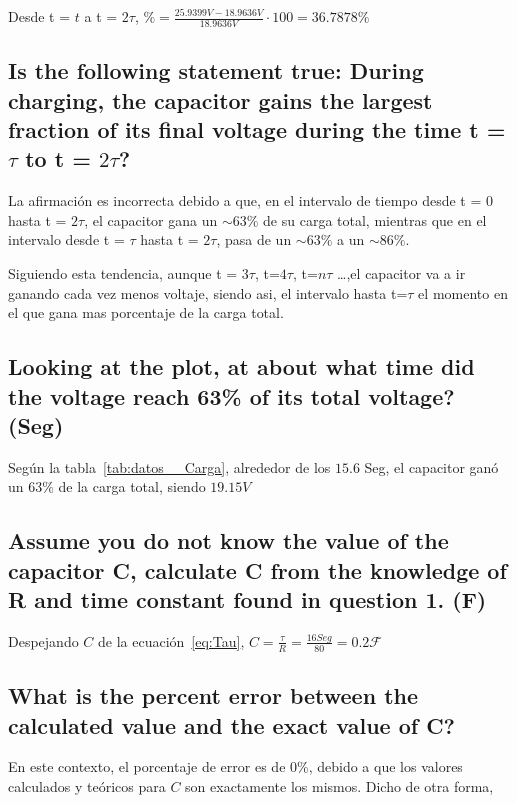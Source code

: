 \documentclass[twocolumn, 12pt]{article}
\begin{document}
Desde t = $t$ a t = $2\tau$, $\% = \frac{25.9399V -
        18.9636V}{18.9636V} \cdot 100 = 36.7878\%$

\subsection{Is the following statement true: During charging, the capacitor gains the largest fraction of
    its final voltage during the time t = $\tau$ to t = $2\tau$?}

La afirmación es incorrecta debido a que, en el intervalo
de tiempo desde t = $0$ hasta t = $2\tau$, el capacitor
gana un $\sim 63\%$ de su carga total, mientras que en el
intervalo desde t = $\tau$ hasta t = $2\tau$, pasa de un
$\sim 63\%$ a un $\sim 86\%$.

Siguiendo esta tendencia, aunque t = $3\tau$, t=$4\tau$,
t=$n\tau$ \dots{},el capacitor va a ir ganando cada vez
menos voltaje, siendo asi, el intervalo hasta t=$\tau$ el
momento en el que gana mas porcentaje de la carga total.

\subsection{Looking at the plot, at about what time did the voltage reach 63\% of its total voltage? (Seg)}

Según la tabla~\ref{tab:datos__Carga}, alrededor de los
$15.6$ Seg, el capacitor ganó un $63\%$ de la carga total,
siendo $19.15V$

\subsection{Assume you do not know the value of the capacitor C, calculate C from the knowledge of
    R and time constant found in question 1. (F)}

Despejando $C$ de la ecuación~\eqref{eq:Tau}, $C =
    \frac{\tau}{R} = \frac{16 Seg}{80} = 0.2 \mathcal{F}$

\subsection{What is the percent error between the calculated value and the exact value of C?}

En este contexto, el porcentaje de error es de 0\%, debido
a que los valores calculados y teóricos para $C$ son
exactamente los mismos. Dicho de otra forma,
\end{document}

